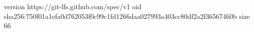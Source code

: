 version https://git-lfs.github.com/spec/v1
oid sha256:750f01a1efa0d762053f0c99c1fd1266daa027993a403cc80df2a2f36567460b
size 66

